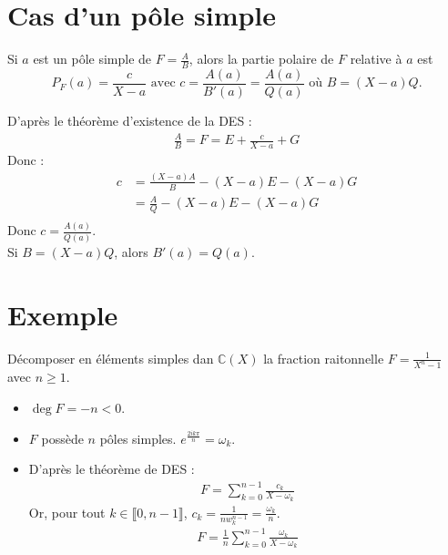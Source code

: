 \documentclass[../main.tex]{subfiles}
\begin{document}
\section{Cas d'un pôle simple}
\begin{tcolorbox}[title=Propostion 17.38, title filled=false, colframe=lightblue, colback=lightblue!10!white]
    Si $a$ est un pôle simple de $F = \frac{A}{B}$, alors la partie polaire de $F$ relative à $a$ est
    $$P_F(a) = \frac{c}{X - a} \text{ avec } c = \frac{A(a)}{B'(a)} = \frac{A(a)}{Q(a)} \text{ où } B = (X - a)Q.$$
\end{tcolorbox}

\noindent D'après le théorème d'existence de la DES : 
\begin{align*}
    \frac{A}{B} = F = E + \frac{c}{X - a} + G
\end{align*}
Donc : 
\begin{align*}
    c &= \frac{(X - a)A}{B} - (X - a)E - (X - a)G \\
    &= \frac{A}{Q} - (X - a)E - (X - a)G \\
\end{align*}
Donc $c = \frac{A(a)}{Q(a)}$. \\
Si $B = (X - a)Q$, alors $B'(a) = Q(a)$.

\section{Exemple}
\begin{tcolorbox}[title=Exemple 17.39, title filled=false, colframe=darkgreen, colback=darkgreen!10!white]
    Décomposer en éléments simples dan $\mathbb{C}(X)$ la fraction raitonnelle $F = \frac{1}{X^n - 1}$ avec $n \geq 1$. 
\end{tcolorbox}

\begin{itemize}
    \item $\deg F = -n < 0$. \\
    \item $F$ possède $n$ pôles simples. $e^{\frac{2ik\pi}{n}} = \omega_k$. 
    \item D'après le théorème de DES : 
    \begin{align*}
        F = \sum_{k=0}^{n-1} \frac{c_k}{X - \omega_k}
    \end{align*}
    Or, pour tout $k \in \llbracket 0, n-1 \rrbracket$, $c_k = \frac{1}{nw_k^{n-1}} = \frac{\omega_k}{n}$. \\
    \begin{align*}
        F = \frac{1}{n} \sum_{k=0}^{n-1} \frac{\omega_k}{X - \omega_k}
    \end{align*}
\end{itemize}
\end{document}
